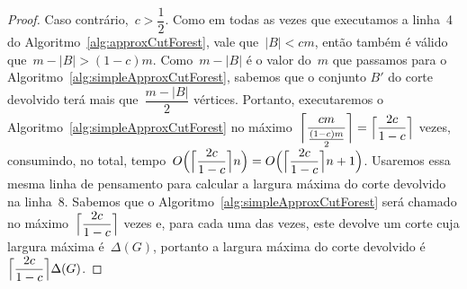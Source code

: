 \begin{proof}
	Caso contrário,~${c>\dfrac{1}{2}}$. Como em todas as vezes que
	executamos a linha~4 do Algoritmo~\ref{alg:approxCutForest}, 
	vale que~${|B|<cm}$, então também é válido que~${m-|B|>(1-c)m}$.
	Como~${m-|B|}$ é o valor do~$m$ que passamos para o 
	Algoritmo~\ref{alg:simpleApproxCutForest}, sabemos que o 
	conjunto $B'$ do corte devolvido terá mais 
	que~$\dfrac{m-|B|}{2}$ vértices.
	Portanto, executaremos o 
	Algoritmo~\ref{alg:simpleApproxCutForest} no 
	máximo~${\ceil[\bigg]{\dfrac{cm}{\frac{(1-c)m}{2}}} 
	=\ceil[\Big]{\dfrac{2c}{1-c}}}$ vezes, consumindo, no total,
	tempo~$O\Big(\ceil[\Big]{ \dfrac{2c}{1-c}} n\Big) = O\Big(\ceil[\Big]{ \dfrac{2c}{1-c}} n+1\Big)$.
	Usaremos essa mesma linha de pensamento para calcular a largura
	máxima do corte devolvido na linha~8. 
	Sabemos que o 
	Algoritmo~\ref{alg:simpleApproxCutForest} será 
	chamado no máximo~$\ceil[\Big]{\dfrac{2c}{1-c}}$ 
	vezes e, para cada uma 
	das vezes, este devolve um corte cuja largura 
	máxima é~$\Delta(G)$, portanto a largura máxima do corte 
	devolvido é~$\ceil[\Big]{\dfrac{2c}{1-c}}\Delta(G)$.
	\end{proof}